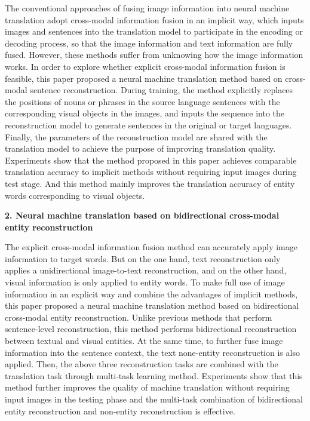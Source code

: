The conventional approaches of fusing image information into neural machine translation adopt cross-modal information fusion in an implicit way, which inputs images and sentences into the translation model to participate in the encoding or decoding process, so that the image information and text information are fully fused. However, these methods suffer from unknowing how the image information works. In order to explore whether explicit cross-modal information fusion is feasible, this paper proposed a neural machine translation method based on cross-modal sentence reconstruction. During training, the method explicitly replaces the positions of nouns or phrases in the source language sentences with the corresponding visual objects in the images, and inputs the sequence into the reconstruction model to generate sentences in the original or target languages. Finally, the parameters of the reconstruction model are shared with the translation model to achieve the purpose of improving translation quality. Experiments show that the method proposed in this paper achieves comparable translation accuracy to implicit methods without requiring input images during test stage. And this method mainly improves the translation accuracy of entity words corresponding to visual objects.

\textbf{2. Neural machine translation based on bidirectional cross-modal entity reconstruction}

The explicit cross-modal information fusion method can accurately apply image information to target words. But on the one hand, text reconstruction only applies a unidirectional image-to-text reconstruction, and on the other hand, visual information is only applied to entity words. To make full use of image information in an explicit way and combine the advantages of implicit methods, this paper proposed a neural machine translation method based on bidirectional cross-modal entity reconstruction. Unlike previous methods that perform sentence-level reconstruction, this method performs bidirectional reconstruction between textual and visual entities. At the same time, to further fuse image information into the sentence context, the text none-entity reconstruction is also applied. Then, the above three reconstruction tasks are combined with the translation task through multi-task learning method. Experiments show that this method further improves the quality of machine translation without requiring input images in the testing phase and the multi-task combination of bidirectional entity reconstruction and non-entity reconstruction is effective.

